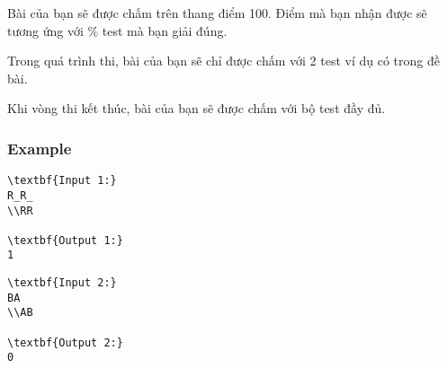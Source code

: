    Bài của bạn sẽ được chấm trên thang điểm 100. Điểm mà bạn nhận được sẽ tương ứng với \% test mà bạn giải đúng.  

   Trong quá trình thi, bài của bạn sẽ chỉ được chấm với 2 test ví dụ có trong đề bài.  

   Khi vòng thi kết thúc, bài của bạn sẽ được chấm với bộ test đầy đủ.  

\subsubsection{   Example  }
\begin{verbatim}
\textbf{Input 1:}
R_R_
\\RR

\textbf{Output 1:}
1
\end{verbatim}
\begin{verbatim}
\textbf{Input 2:}
BA
\\AB

\textbf{Output 2:}
0\end{verbatim}